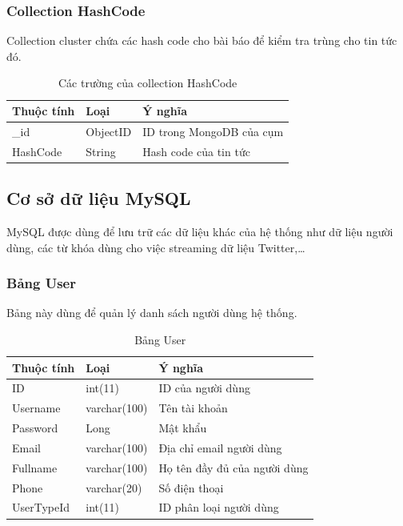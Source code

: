 		\subsubsection{Collection HashCode}
		Collection cluster chứa các hash code cho bài báo để kiểm tra trùng cho tin tức đó.
		\begin{table}[H]
			\setlength\extrarowheight{3pt}
			\begin{tabular}{|l|l|p{9cm}|}
				\hline
				\textbf{Thuộc tính}     & \textbf{Loại} & \textbf{Ý nghĩa} \\\hline
				\_id           & ObjectID       &  ID trong MongoDB của cụm\\\hline
				HashCode      & String           & Hash code của tin tức\\\hline
			\end{tabular}%
			\caption{Các trường của collection HashCode}
			\label{tab:table_3_3}%
		\end{table}%

	\subsection{Cơ sở dữ liệu MySQL}
	MySQL được dùng để lưu trữ các dữ liệu khác của hệ thống như dữ liệu người dùng, các từ khóa dùng cho việc streaming dữ liệu Twitter,…
		\subsubsection{Bảng User}
		Bảng này dùng để quản lý danh sách người dùng hệ thống.
			\begin{table}[H]
				\centering
				\setlength\extrarowheight{3pt}
				\begin{tabular}{|l|l|l|}
					\hline
					\textbf{Thuộc tính} & \textbf{Loại} & \textbf{Ý nghĩa} \\ \hline
					ID & int(11) & ID của người dùng\\\hline
					Username & varchar(100) &  Tên tài khoản\\\hline
					Password & Long &  Mật khẩu\\\hline
					Email & varchar(100) &  Địa chỉ email người dùng\\\hline
					Fullname & varchar(100) &  Họ tên đầy đủ của người dùng\\\hline
					Phone & varchar(20) &  Số điện thoại\\\hline
					UserTypeId & int(11) &  ID phân loại người dùng\\\hline
				\end{tabular}
				\caption{Bảng User}
				\label{tab:usertable}
			\end{table}
